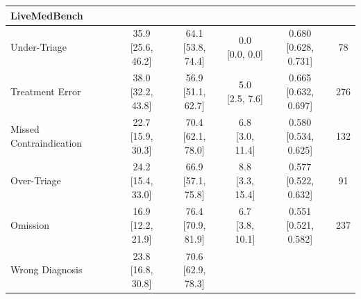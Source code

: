 {\begin{longtable}{l c c c c c}
    \multicolumn{6}{l}{\textbf{LiveMedBench}} \\
    \midrule
    Under-Triage &
        \makecell{35.9 \\ \footnotesize{[25.6, 46.2]}} &
        \makecell{64.1 \\ \footnotesize{[53.8, 74.4]}} &
        \makecell{0.0 \\ \footnotesize{[0.0, 0.0]}} &
        \makecell{0.680 \\ \footnotesize{[0.628, 0.731]}} &
        78 \\
    Treatment Error &
        \makecell{38.0 \\ \footnotesize{[32.2, 43.8]}} &
        \makecell{56.9 \\ \footnotesize{[51.1, 62.7]}} &
        \makecell{5.0 \\ \footnotesize{[2.5, 7.6]}} &
        \makecell{0.665 \\ \footnotesize{[0.632, 0.697]}} &
        276 \\
    Missed Contraindication &
        \makecell{22.7 \\ \footnotesize{[15.9, 30.3]}} &
        \makecell{70.4 \\ \footnotesize{[62.1, 78.0]}} &
        \makecell{6.8 \\ \footnotesize{[3.0, 11.4]}} &
        \makecell{0.580 \\ \footnotesize{[0.534, 0.625]}} &
        132 \\
    Over-Triage &
        \makecell{24.2 \\ \footnotesize{[15.4, 33.0]}} &
        \makecell{66.9 \\ \footnotesize{[57.1, 75.8]}} &
        \makecell{8.8 \\ \footnotesize{[3.3, 15.4]}} &
        \makecell{0.577 \\ \footnotesize{[0.522, 0.632]}} &
        91 \\
    Omission &
        \makecell{16.9 \\ \footnotesize{[12.2, 21.9]}} &
        \makecell{76.4 \\ \footnotesize{[70.9, 81.9]}} &
        \makecell{6.7 \\ \footnotesize{[3.8, 10.1]}} &
        \makecell{0.551 \\ \footnotesize{[0.521, 0.582]}} &
        237 \\
    Wrong Diagnosis &
        \makecell{23.8 \\ \footnotesize{[16.8, 30.8]}} &
        \makecell{70.6 \\ \footnotesize{[62.9, 78.3]}} &

\end{longtable}}
